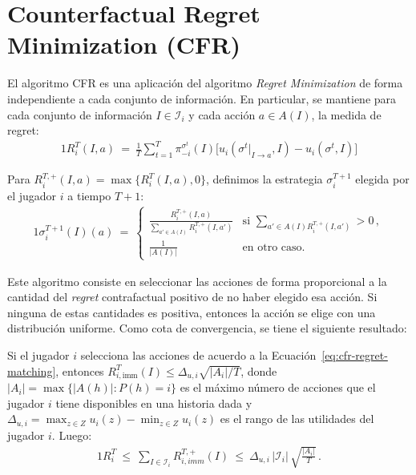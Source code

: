 \section{Counterfactual Regret Minimization (CFR)}
\label{section:cfr}

El algoritmo CFR \cite{bib:cfr} es una aplicación del algoritmo \textit{Regret Minimization} de forma independiente a cada conjunto de información. En particular, se mantiene para cada conjunto de información $I \in \mathcal{I}_i$ y cada acción $a \in A(I)$, la medida de regret:
\begin{alignat}{1}
R_i^T(I, a)\ =\ \frac{1}{T} \sum_{t = 1}^T \pi^{\sigma^t}_{-i}(I)\biggl[u_i(\sigma^t|_{I \rightarrow a}, I) - u_i(\sigma^t, I)\biggr]
\end{alignat}

Para $R_i^{T, +}(I, a) = \max\{R_i^T(I, a), 0\}$, definimos la estrategia $\sigma^{T+1}_i$ elegida por el jugador $i$ a tiempo $T+1$:
\begin{alignat}{1}
\label{eq:cfr-regret-matching}
\sigma_i^{T+1}(I)(a)\ =\
\begin{cases}
\frac{R_i^{T, +}(I, a)}{\sum_{a' \in A(I)} R_i^{T, +}(I, a')} & \text{si } \sum_{a' \in A(I) R_i^{T, +}(I, a')} > 0 \,, \\
\frac{1}{|A(I)|} & \text{en otro caso.} 
\end{cases}
\end{alignat}

Este algoritmo consiste en seleccionar las acciones de forma proporcional a la cantidad del \textit{regret} contrafactual positivo de no haber elegido esa acción. Si ninguna de estas cantidades es positiva, entonces la acción se elige con una distribución uniforme. Como cota de convergencia, se tiene el siguiente resultado:

\begin{theorem}
Si el jugador $i$ selecciona las acciones de acuerdo a la Ecuación~\ref{eq:cfr-regret-matching}, entonces $R^T_{i, \text{imm}}(I) \leq \Delta_{u, i} \sqrt{|A_i|/T}$, donde $|A_i| = \max \{ |A(h)| : P(h) = i \}$ es el máximo número de acciones que el jugador $i$ tiene disponibles en una historia dada y  $\Delta_{u,i} = \max_{z \in Z}u_i(z) - \min_{z \in Z}u_i(z)$ es el rango de las utilidades del jugador $i$. Luego:
\begin{alignat}{1}
R_i^T\ \leq\ \sum_{I\in\mathcal{I}_i} R^{T,+}_{i,imm}(I) \ 
        \leq\ \Delta_{u,i}\,|\mathcal{I}_i|\,\sqrt{\frac{|A_i|}{T}} \,.
\end{alignat}
\end{theorem}


